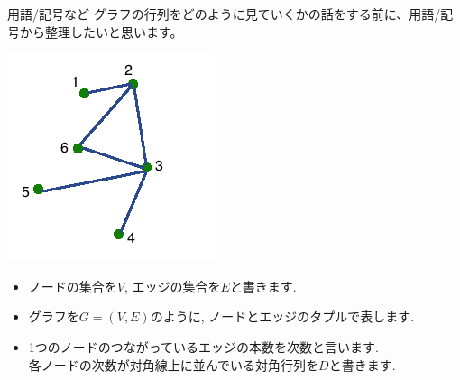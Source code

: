 \documentclass[dvipdfmx,11pt]{beamer}
\theoremstyle{definition}
\begin{document}
\begin{frame}{用語/記号など}
グラフの行列をどのように見ていくかの話をする前に、用語/記号から整理したいと思います。

\begin{minipage}[c]{.35\textwidth}
 \begin{center}
  \includegraphics[width=\textwidth]{images/graph_to_matrix.png}
 \end{center}
\end{minipage}
\begin{minipage}[c]{.6\textwidth}
\begin{itemize}
\item ノードの集合を$V$, エッジの集合を$E$と書きます. 
\item グラフを$G = (V, E)$のように, ノードとエッジのタプルで表します. 
\item 1つのノードのつながっているエッジの本数を次数と言います. \\
各ノードの次数が対角線上に並んでいる対角行列を$D$と書きます.
\end{itemize}
\end{minipage}

\end{frame}
\end{document}
